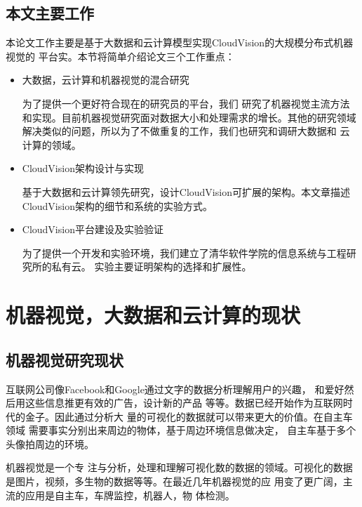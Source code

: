 \section{本文主要工作}
\label{sec:main_work}

本论文工作主要是基于大数据和云计算模型实现CloudVision的大规模分布式机器视觉的
平台实。本节将简单介绍论文三个工作重点：
\begin{itemize}
  \item 大数据，云计算和机器视觉的混合研究

        为了提供一个更好符合现在的研究员的平台，我们
        研究了机器视觉主流方法和实现。目前机器视觉研究面对数据大小和处理需求的增长。其他的研究领域
        解决类似的问题，所以为了不做重复的工作，我们也研究和调研大数据和
        云计算的领域。

  \item CloudVision架构设计与实现

        基于大数据和云计算领先研究，设计CloudVision可扩展的架构。本文章描述
        CloudVision架构的细节和系统的实验方式。

  \item CloudVision平台建设及实验验证

        为了提供一个开发和实验环境，我们建立了清华软件学院的信息系统与工程研究所的私有云。
        实验主要证明架构的选择和扩展性。

\end{itemize}
        


\chapter{机器视觉，大数据和云计算的现状}
\label{sec:current_state}

\section{机器视觉研究现状}
\label{subsec:cv_background}
互联网公司像Facebook和Google通过文字的数据分析理解用户的兴趣，
和爱好然后用这些信息推更有效的广告，设计新的产品
等等。数据已经开始作为互联网时代的金子。因此通过分析大
量的可视化的数据就可以带来更大的价值。在自主车领域
需要事实分别出来周边的物体，基于周边环境信息做决定，
自主车基于多个头像拍周边的环境。

机器视觉是一个专
注与分析，处理和理解可视化数的数据的领域。可视化的数据
是图片，视频，多生物的数据等等。在最近几年机器视觉的应
用变了更广阔，主流的应用是自主车，车牌监控，机器人，物
体检测。


